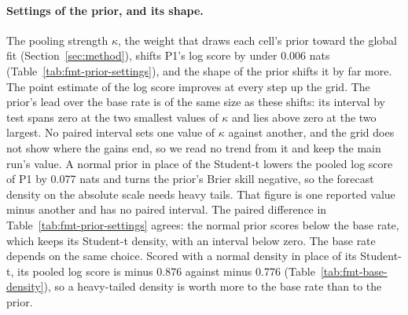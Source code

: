 \paragraph{Settings of the prior, and its shape.}
The pooling strength $\kappa$, the weight that draws each cell's prior toward the global fit (Section~\ref{sec:method}), shifts P1's log score by under 0.006 nats (Table~\ref{tab:fmt-prior-settings}), and the shape of the prior shifts it by far more. The point estimate of the log score improves at every step up the grid. The prior's lead over the base rate is of the same size as these shifts: its interval by test spans zero at the two smallest values of $\kappa$ and lies above zero at the two largest. No paired interval sets one value of $\kappa$ against another, and the grid does not show where the gains end, so we read no trend from it and keep the main run's value.
A normal prior in place of the Student-t lowers the pooled log score of P1 by 0.077 nats and turns the prior's Brier skill negative, so the forecast density on the absolute scale needs heavy tails. That figure is one reported value minus another and has no paired interval. The paired difference in Table~\ref{tab:fmt-prior-settings} agrees: the normal prior scores below the base rate, which keeps its Student-t density, with an interval below zero.
The base rate depends on the same choice. Scored with a normal density in place of its Student-t, its pooled log score is minus 0.876 against minus 0.776 (Table~\ref{tab:fmt-base-density}), so a heavy-tailed density is worth more to the base rate than to the prior.

